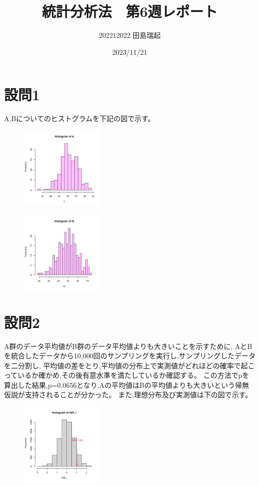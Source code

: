 \documentclass[fontsize = 10pt, paper= a4,twocolumn,column_gap=5zw]{jlreq}
\begin{document}
\title{統計分析法　第6週レポート}
\author{202212022 田島瑞起}
\date{2023/11/21}
\maketitle
\section{設問1}
    A,Bについてのヒストグラムを下記の図で示す。
    \begin{figure}
        \centering
        \includegraphics[width=4cm]{6-1.png}
    \end{figure}
    \begin{figure}
        \centering
        \includegraphics[width=4cm]{6-2.png}
    \end{figure}
\section{設問2}
    A群のデータ平均値がB群のデータ平均値よりも大きいことを示すために,
    AとBを統合したデータから10,000回のサンプリングを実行し,サンプリングしたデータを二分割し,
    平均値の差をとり,平均値の分布上で実測値がどれほどの確率で起こっているか確かめ,その後有意水準を満たしているか確認する。
    この方法でpを算出した結果,p=0.0656となり,Aの平均値はBの平均値よりも大きいという帰無仮説が支持されることが分かった。
    また,理想分布及び実測値は下の図で示す。
    \begin{figure}
        \centering
        \includegraphics[width=4cm]{6-3.png}
    \end{figure}
\end{document}
